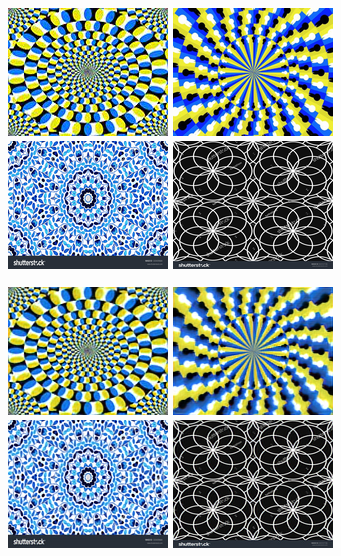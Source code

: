 \documentclass[journal]{IEEEtran}
\begin{document}
  \begin{figure}
    \centering
    \includegraphics[width=0.24\linewidth]{fig/rotate-0.png}
    \includegraphics[width=0.24\linewidth]{fig/rotate-1.png}
    \includegraphics[width=0.24\linewidth]{fig/control-0.png}
    \includegraphics[width=0.24\linewidth]{fig/control-1.png}
  
    \includegraphics[width=0.24\linewidth]{fig/rotate-0-7.png}
    \includegraphics[width=0.24\linewidth]{fig/rotate-1-7.png}
    \includegraphics[width=0.24\linewidth]{fig/control-0-7.png}
    \includegraphics[width=0.24\linewidth]{fig/control-1-7.png}
  

\end{figure}
\end{document}
